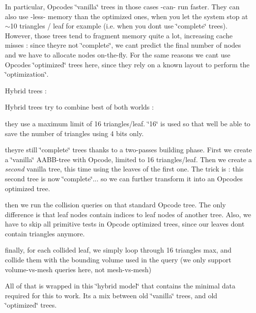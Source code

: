 In particular, Opcode\textquotesingle{}s \char`\"{}vanilla\char`\"{} trees in those cases -\/can-\/ run faster. They can also use -\/less-\/ memory than the optimized ones, when you let the system stop at $\sim$10 triangles / leaf for example (i.\+e. when you don\textquotesingle{}t use \char`\"{}complete\char`\"{} trees). However, those trees tend to fragment memory quite a lot, increasing cache misses \+: since they\textquotesingle{}re not \char`\"{}complete\char`\"{}, we can\textquotesingle{}t predict the final number of nodes and we have to allocate nodes on-\/the-\/fly. For the same reasons we can\textquotesingle{}t use Opcode\textquotesingle{}s \char`\"{}optimized\char`\"{} trees here, since they rely on a known layout to perform the \char`\"{}optimization\char`\"{}.

Hybrid trees \+:

Hybrid trees try to combine best of both worlds \+:


\begin{DoxyItemize}
\item they use a maximum limit of 16 triangles/leaf. \char`\"{}16\char`\"{} is used so that we\textquotesingle{}ll be able to save the number of triangles using 4 bits only.
\item they\textquotesingle{}re still \char`\"{}complete\char`\"{} trees thanks to a two-\/passes building phase. First we create a \char`\"{}vanilla\char`\"{} A\+A\+B\+B-\/tree with Opcode, limited to 16 triangles/leaf. Then we create a {\itshape second} vanilla tree, this time using the leaves of the first one. The trick is \+: this second tree is now \char`\"{}complete\char`\"{}... so we can further transform it into an Opcode\textquotesingle{}s optimized tree.
\item then we run the collision queries on that standard Opcode tree. The only difference is that leaf nodes contain indices to leaf nodes of another tree. Also, we have to skip all primitive tests in Opcode optimized trees, since our leaves don\textquotesingle{}t contain triangles anymore.
\item finally, for each collided leaf, we simply loop through 16 triangles max, and collide them with the bounding volume used in the query (we only support volume-\/vs-\/mesh queries here, not mesh-\/vs-\/mesh)
\end{DoxyItemize}

All of that is wrapped in this \char`\"{}hybrid model\char`\"{} that contains the minimal data required for this to work. It\textquotesingle{}s a mix between old \char`\"{}vanilla\char`\"{} trees, and old \char`\"{}optimized\char`\"{} trees.

